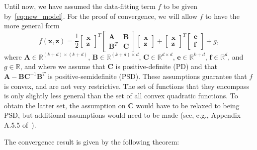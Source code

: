 \documentclass[10pt,twocolumn,twoside]{IEEEtran}
\newcommand{\x}{\mathbf{x}} %
\newcommand{\z}{\mathbf{z}} %
\newcommand{\A}{\mathbf{A}} %
\newcommand{\B}{\mathbf{B}} %
\newcommand{\C}{\mathbf{C}} %
\newcommand{\e}{\mathbf{e}} %
\newcommand{\f}{\mathbf{f}} %
\begin{document}
Until now, we have assumed the data-fitting term $f$ to be given by~\eqref{eq:new_model}. For the proof of convergence, we will allow $f$ to have the more general form
\begin{equation} \label{eq:quadratic_f}
f(\x, \z) = \frac{1}{2} \begin{bmatrix} \x \\ \z \end{bmatrix}^T \begin{bmatrix} \A & \B \\ \B^T & \C \end{bmatrix} \begin{bmatrix} \x \\ \z \end{bmatrix} + \begin{bmatrix} \x \\ \z \end{bmatrix}^T \begin{bmatrix} \e \\ \f \end{bmatrix} + g,
\end{equation}
where $\A \in \mathbb{R}^{(k+d) \times (k+d)}$, $\B \in \mathbb{R}^{(k+d) \times d}$, $\C \in \mathbb{R}^{d \times d}$, $\e \in \mathbb{R}^{k+d}$, $\f \in \mathbb{R}^{d}$, and $g \in \mathbb{R}$, and where we assume that $\C$ is positive-definite (PD) and that $\A - \B \C^{-1} \B^T$ is positive-semidefinite (PSD). These assumptions guarantee that $f$ is convex, and are not very restrictive. The set of functions that they encompass is only slightly less general than the set of all convex quadratic functions. To obtain the latter set, the assumption on $\C$ would have to be relaxed to being PSD, but additional assumptions would need to be made (see, e.g., Appendix A.5.5 of~\cite{Boyd2004}).

The convergence result is given by the following theorem:
\end{document}
